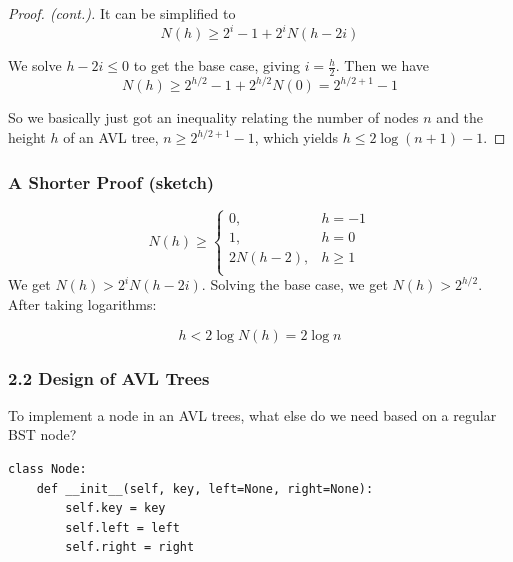 \documentclass[aspectratio=169, 14pt]{beamer}
\begin{document}
\begin{frame}
\begin{proof}[Proof. (cont.)]
It can be simplified to
\[N(h) \geq 2^{i} - 1 + 2^iN(h-2i)\]

We solve $h-2i \leq 0$ to get the base case, giving $i = \frac{h}{2}$. Then we have
\[N(h) \geq 2^{h/2} - 1 + 2^{h/2}N(0) = 2^{h/2 + 1} - 1\] 

So we basically just got an inequality relating the number of nodes $n$ and the height $h$ of an AVL tree, $n\geq 2^{h/2 + 1} - 1$, which yields $h \leq 2\log{(n + 1)} - 1$.
\end{proof}
    

\end{frame}

\begin{frame}
    \frametitle{A Shorter Proof (sketch)}

    \[
        N(h) \geq
    \begin{cases}
        0,& h = -1\\
        1, & h = 0 \\
        2N(h - 2), & h \geq 1 \\
    \end{cases}
    \]
We get $N(h) > 2^{i}N(h-2i)$. Solving the base case, we get $N(h) > 2^{h/2}$. After taking logarithms:

\[h < 2\log{N(h)} = 2\log{n}\]
\end{frame}



\begin{frame}[fragile]
    \frametitle{2.2 Design of AVL Trees}
    
 To implement a node in an AVL trees, what else do we need based on a regular BST node?
    \begin{verbatim}
class Node:
    def __init__(self, key, left=None, right=None):
        self.key = key
        self.left = left
        self.right = right
    \end{verbatim}
\end{frame}
\end{document}
